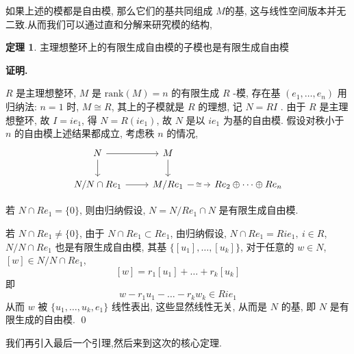 \documentclass[12pt, a4paper,oneside, UTF8]{ctexart}
\theoremstyle{definition}
\newtheorem{thm}[lemma]{\indent 定理}
\theoremstyle{plain}
\renewenvironment{proof}{\par\textbf{证明.}\;}{\qed\par}
\begin{document}
如果上述的模都是自由模, 那么它们的基共同组成 $M$的基, 这与线性空间版本并无二致.从而我们可以通过直和分解来研究模的结构, 
\begin{thm}
    主理想整环上的有限生成自由模的子模也是有限生成自由模
\end{thm}
\begin{proof}

    $R$ 是主理想整环,  $M$ 是 $\mathrm{rank}(M) = n$ 的有限生成 $R$ -模,  存在基 $(e_{1},\dots,e_{n})$ 用归纳法: $n =1$ 时,  $M \cong R$, 其上的子模就是 $R$ 的理想, 记 $N = RI$ . 由于 $R$ 是主理想整环, 故 $I =ie_{1}$, 得 $N = R(ie_{1})$, 故 $N$ 是以 $ie_{1}$ 为基的自由模.
假设对秩小于 $n$ 的自由模上述结果都成立, 考虑秩 $n$ 的情况,  
\vspace*{2em}
\[\begin{tikzcd}
	N & M \\
	{N/N\cap Re_1} & {M/Re_1 } & {Re_2 \oplus\cdots\oplus Re_n}
	\arrow[from=1-1, to=1-2]
	\arrow[from=1-1, to=2-1]
	\arrow[from=1-2, to=2-2]
	\arrow[from=2-1, to=2-2]
	\arrow["\cong"{description}, from=2-2, to=2-3]
\end{tikzcd}\]

若 $N \cap R e_{1} =\{ 0 \}$, 则由归纳假设,  $N = N/ R e_{1}\cap N$ 是有限生成自由模.

若 $N \cap R e_{1} \neq\{ 0 \}$, 由于 $N \cap R e_{1} \subset R e_{1}$, 由归纳假设, $N \cap R e_{1}=Ri e_{1}, \ i \in R$, $N / N \cap R e_{1}$ 也是有限生成自由模, 其基 $\{ [u_{1}],\dots,[u_{k}] \}$, 对于任意的 $w \in N$,  $[w] \in N / N \cap R e_{1}$,
$$[w] =r_{1}[u_{1}]+\dots +r_{k}[u_{k}]$$
即
$$w -r_{1}u_{1}-\dots-r_{k}w_{k}\in R i e_{1}$$
从而 $w$ 被 $\{ u_{1},\dots,u_{k},e_{1} \}$ 线性表出, 这些显然线性无关, 从而是 $N$ 的基, 即 $N$ 是有限生成的自由模.  
\end{proof}


我们再引入最后一个引理,然后来到这次的核心定理.
\end{document}

